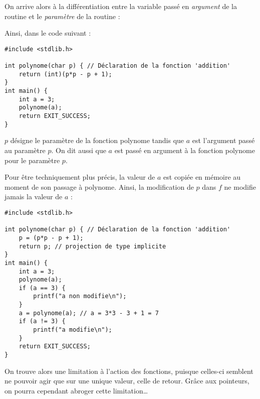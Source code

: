 \documentclass[../../../main.tex]{subfiles}
\begin{document}
On arrive alors à la différentiation entre la variable passé en \textit{argument} de la routine et le \textit{paramètre} de la routine :  

Ainsi, dans le code suivant :
\begin{verbatim}
#include <stdlib.h>

int polynome(char p) { // Déclaration de la fonction 'addition'
	return (int)(p*p - p + 1);
}
int main() {
	int a = 3;
	polynome(a);
	return EXIT_SUCCESS;
}
\end{verbatim}
$p$ désigne le paramètre de la fonction \textsf{polynome} tandis que $a$ est l'argument passé au paramètre $p$. On dit aussi que $a$ est passé en argument à la fonction \textsf{polynome} pour le paramètre $p$.
 
Pour être techniquement plus précis, la valeur de $a$ est copiée en mémoire au moment de son passage à \textsf{polynome}. Ainsi, la modification de $p$ dans $f$ ne modifie jamais la valeur de $a$ :
\begin{verbatim}
#include <stdlib.h>

int polynome(char p) { // Déclaration de la fonction 'addition'
	p = (p*p - p + 1);
	return p; // projection de type implicite
}
int main() {
	int a = 3;
	polynome(a);
	if (a == 3) {
		printf("a non modifie\n");
	}
	a = polynome(a); // a = 3*3 - 3 + 1 = 7
	if (a != 3) {
		printf("a modifie\n");
	}
	return EXIT_SUCCESS;
}
\end{verbatim}
On trouve alors une limitation à l'action des fonctions, puisque celles-ci semblent ne pouvoir agir que sur une unique valeur, celle de retour. Grâce aux pointeurs, on pourra cependant abroger cette limitation\dots
\end{document}
